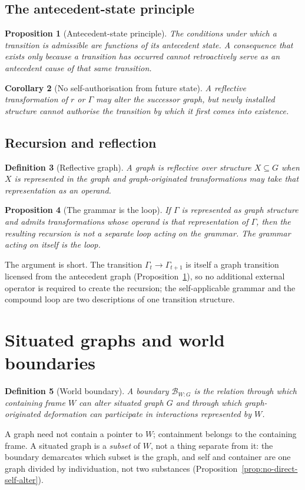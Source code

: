 \documentclass[11pt,a4paper]{article}
\newtheorem{definition}{Definition}[section]
\newtheorem{proposition}[definition]{Proposition}
\newtheorem{corollary}[definition]{Corollary}
\theoremstyle{remark}\newtheorem{remark}[definition]{Remark}
\begin{document}
\subsection{The antecedent-state principle}\label{sec:antecedent}
\begin{proposition}[Antecedent-state principle]\label{prop:antecedent-state}
The conditions under which a transition is admissible are functions of its antecedent state. A consequence that exists only because a transition has occurred cannot retroactively serve as an antecedent cause of that same transition.
\end{proposition}
\begin{corollary}[No self-authorisation from future state]\label{cor:no-self-auth}
A reflective transformation of $r$ or $\Gamma$ may alter the successor graph, but newly installed structure cannot authorise the transition by which it first comes into existence.
\end{corollary}

\subsection{Recursion and reflection}\label{sec:reflection}
\begin{definition}[Reflective graph]\label{def:reflective}
A graph is reflective over structure $X\subseteq G$ when $X$ is represented in the graph and graph-originated transformations may take that representation as an operand.
\end{definition}
\begin{proposition}[The grammar is the loop]\label{prop:grammar-is-loop}
If $\Gamma$ is represented as graph structure and admits transformations whose operand is that representation of $\Gamma$, then the resulting recursion is not a separate loop acting on the grammar. The grammar acting on itself is the loop.
\end{proposition}
The argument is short. The transition $\Gamma_t\rightarrow\Gamma_{t+1}$ is itself a graph transition licensed from the antecedent graph (Proposition~\ref{prop:antecedent-state}), so no additional external operator is required to create the recursion; the self-applicable grammar and the compound loop are two descriptions of one transition structure.

\section{Situated graphs and world boundaries}\label{sec:situated}
\begin{definition}[World boundary]\label{def:world-boundary}
A boundary $\mathcal B_{W:G}$ is the relation through which containing frame $W$ can alter situated graph $G$ and through which graph-originated deformation can participate in interactions represented by $W$.
\end{definition}
A graph need not contain a pointer to $W$; containment belongs to the containing frame. A situated graph is a \emph{subset} of $W$, not a thing separate from it: the boundary demarcates which subset is the graph, and self and container are one graph divided by individuation, not two substances (Proposition~\ref{prop:no-direct-self-alter}).
\end{document}
